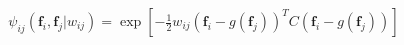 \documentclass[10pt]{article}
\begin{document}
\begin{align*}\psi_{ij}(\boldsymbol{f}_i,\boldsymbol{f}_j| w_{ij}) = \exp\left[-\frac{1}{2}w_{ij}(\boldsymbol{f}_i-g(\boldsymbol{f}_j))^TC(\boldsymbol{f}_i-g(\boldsymbol{f}_j))\right]\end{align*}
\end{document}
